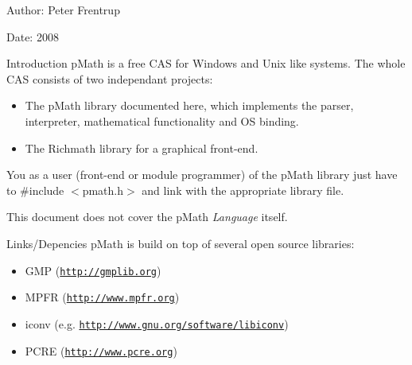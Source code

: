 \begin{Desc}
\item[Author:]Peter Frentrup \end{Desc}
\begin{Desc}
\item[Date:]2008\end{Desc}
\begin{Desc}
\item[Introduction]pMath is a free CAS for Windows and Unix like systems. The whole CAS consists of two independant projects:\begin{itemize}
\item The pMath library documented here, which implements the parser, interpreter, mathematical functionality and OS binding.\item The Richmath library for a graphical front-end.\end{itemize}
\end{Desc}
You as a user (front-end or module programmer) of the pMath library just have to \#include $<$pmath.h$>$ and link with the appropriate library file.

This document does not cover the pMath {\em Language\/} itself.

\begin{Desc}
\item[Links/Depencies]pMath is build on top of several open source libraries:\begin{itemize}
\item GMP (\href{http://gmplib.org}{\tt http://gmplib.org})\item MPFR (\href{http://www.mpfr.org}{\tt http://www.mpfr.org})\item iconv (e.g. \href{http://www.gnu.org/software/libiconv}{\tt http://www.gnu.org/software/libiconv})\item PCRE (\href{http://www.pcre.org}{\tt http://www.pcre.org}) \end{itemize}
\end{Desc}
